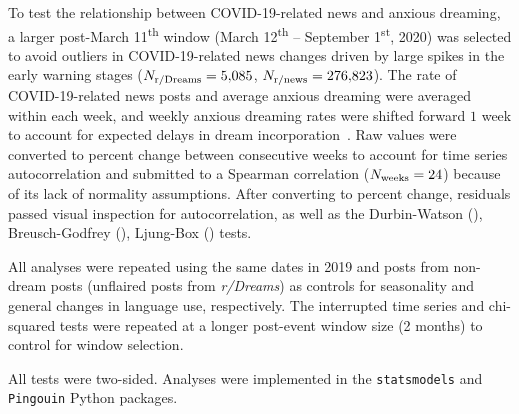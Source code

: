 \documentclass[11pt,a4paper,twocolumn]{article}
\begin{document}
\par
To test the relationship between COVID-19-related news and anxious dreaming, a larger post-March 11\textsuperscript{th} window (March 12\textsuperscript{th} -- September 1\textsuperscript{st}, 2020) was selected to avoid outliers in COVID-19-related news changes driven by large spikes in the early warning stages ($N_{\text{r/Dreams}} = 5{,}085$, $N_\text{r/news} = 276{,}823$). The rate of COVID-19-related news posts and average anxious dreaming were averaged within each week, and weekly anxious dreaming rates were shifted forward $1$ week to account for expected delays in dream incorporation~\supercite{picard2022targeted}. Raw values were converted to percent change between consecutive weeks to account for time series autocorrelation and submitted to a Spearman correlation ($N_\text{weeks} = 24$) because of its lack of normality assumptions. After converting to percent change, residuals passed visual inspection for autocorrelation, as well as the Durbin-Watson (\corrDurbinWatson), Breusch-Godfrey (\corrBreuschGodfrey), Ljung-Box (\corrLjungBox) tests.

\par
All analyses were repeated using the same dates in 2019 and posts from non-dream posts (unflaired posts from \textit{r/Dreams}) as controls for seasonality and general changes in language use, respectively. The interrupted time series and chi-squared tests were repeated at a longer post-event window size (2 months) to control for window selection.

\par
All tests were two-sided. Analyses were implemented in the \texttt{statsmodels} and \texttt{Pingouin} Python packages.

\printbibliography
\end{document}
